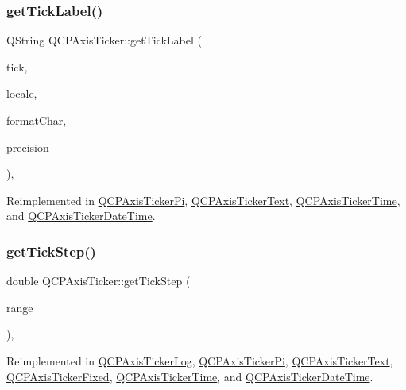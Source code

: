 \subsubsection{\texorpdfstring{get\+Tick\+Label()}{getTickLabel()}}
{\footnotesize\ttfamily Q\+String Q\+C\+P\+Axis\+Ticker\+::get\+Tick\+Label (\begin{DoxyParamCaption}\item[{double}]{tick,  }\item[{const Q\+Locale \&}]{locale,  }\item[{Q\+Char}]{format\+Char,  }\item[{int}]{precision }\end{DoxyParamCaption})\hspace{0.3cm}{\ttfamily [protected]}, {\ttfamily [virtual]}}



Reimplemented in \hyperlink{class_q_c_p_axis_ticker_pi_a9a087d931d4344b8a91d5cecceff7109}{Q\+C\+P\+Axis\+Ticker\+Pi}, \hyperlink{class_q_c_p_axis_ticker_text_a99247779a9c20bea1f50911117540a71}{Q\+C\+P\+Axis\+Ticker\+Text}, \hyperlink{class_q_c_p_axis_ticker_time_a046eb771bdf2a959f570db542b3a0be6}{Q\+C\+P\+Axis\+Ticker\+Time}, and \hyperlink{class_q_c_p_axis_ticker_date_time_a4dc6a03f7ea5c619477528a683ed5c18}{Q\+C\+P\+Axis\+Ticker\+Date\+Time}.

\mbox{\label{class_q_c_p_axis_ticker_a910d69bcec2de37e92d8d4e1ecf201e2}} 
\subsubsection{\texorpdfstring{get\+Tick\+Step()}{getTickStep()}}
{\footnotesize\ttfamily double Q\+C\+P\+Axis\+Ticker\+::get\+Tick\+Step (\begin{DoxyParamCaption}\item[{const \hyperlink{class_q_c_p_range}{Q\+C\+P\+Range} \&}]{range }\end{DoxyParamCaption})\hspace{0.3cm}{\ttfamily [protected]}, {\ttfamily [virtual]}}



Reimplemented in \hyperlink{class_q_c_p_axis_ticker_log_a57be974214a065d3247406331f02fa49}{Q\+C\+P\+Axis\+Ticker\+Log}, \hyperlink{class_q_c_p_axis_ticker_pi_a55301f0072983bd2d7c131a24e1779e7}{Q\+C\+P\+Axis\+Ticker\+Pi}, \hyperlink{class_q_c_p_axis_ticker_text_a628f16c41905e8c95c6622d6757a38c4}{Q\+C\+P\+Axis\+Ticker\+Text}, \hyperlink{class_q_c_p_axis_ticker_fixed_a9e99da01ab92a86aed415eef32fed13a}{Q\+C\+P\+Axis\+Ticker\+Fixed}, \hyperlink{class_q_c_p_axis_ticker_time_a5615064642090fe193797caea8b98cb4}{Q\+C\+P\+Axis\+Ticker\+Time}, and \hyperlink{class_q_c_p_axis_ticker_date_time_a0560c14a3f87bb99ab136aca8321b32a}{Q\+C\+P\+Axis\+Ticker\+Date\+Time}.

